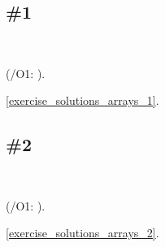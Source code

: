 \section{\Exercises}

\subsection{\Exercise \#1}
\label{exercise_array_1}

\WhatThisCodeDoes\



(/O1: ).









\Answer\: \ref{exercise_solutions_arrays_1}.

\subsection{\Exercise \#2}
\label{exercise_array_2}

\WhatThisCodeDoes\



(/O1: ).









\Answer\: \ref{exercise_solutions_arrays_2}.

